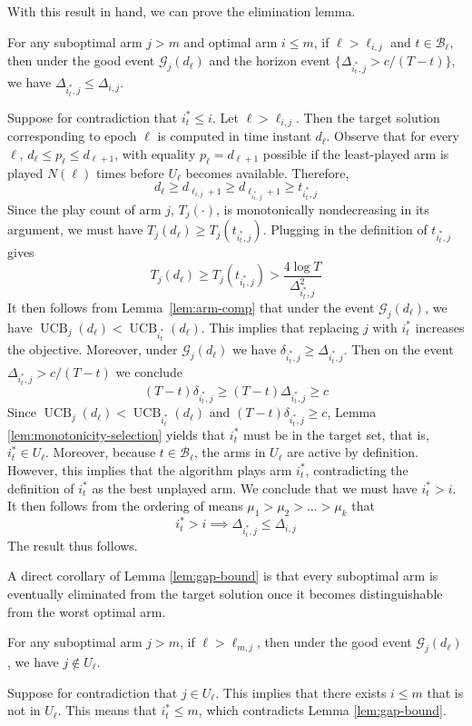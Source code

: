 \documentclass[opre,blindrev]{informs3}
\newcommand{\UCB}{\operatorname{UCB}}
\begin{document}
\begin{APPENDICES}
With this result in hand, we can prove the elimination lemma.
\begin{lemma} \label{lem:gap-bound}
    For any suboptimal arm \(j>m\) and optimal arm \(i\leq m\), if \(\ell> \ell_{i,j}\) and \(t\in \mathcal{B}_{\ell}\), then under the good event \(\mathcal{G}_j(d_\ell)\) and the horizon event \(\{\Delta_{i^*_t, j}> c/(T-t)\}\), we have 
 \(\Delta_{i^*_t,j}\leq \Delta_{i,j}\). 
\end{lemma}
    Suppose for contradiction that \(i^*_t\leq i\). Let \(\ell > \ell_{i,j}\). Then the target solution corresponding to epoch \(\ell\) is computed in time instant \(d_\ell\). Observe that 
    for every \(\ell\), \( d_\ell \leq  p_\ell \leq  d_{\ell+1}\),
    with equality \(p_\ell=d_{\ell +1}\) possible if the least-played arm is played \(N(\ell)\) times before \(U_{\ell}\) becomes available. Therefore,
    \[d_\ell\geq d_{\ell_{i,j}+1} \geq d_{\ell_{i^*_t,j}+1}\geq t_{i^*_t,j}\]
    Since the play count of arm \(j\), \(T_j(\cdot)\), is monotonically nondecreasing in its argument, we must have \(T_j(d_\ell)\geq T_j(t_{i^*_t,j})\). 
    Plugging in the definition of \(t_{i^*_t,j}\) gives
    \[T_j(d_\ell)\geq T_j(t_{i^*_t,j})>\frac{4\log T}{\Delta^2_{i^*_t,j}}\]
    It then follows from Lemma~\ref{lem:arm-comp} that under the event \(\mathcal{G}_j(d_\ell)\), we have \(\UCB_j(d_\ell)<\UCB_{i^*_t}(d_\ell)\).
    This implies that replacing \(j\) with \(i^*_t\) increases the objective. Moreover, under \(\mathcal{G}_j(d_{\ell})\) we have \(\delta_{i^*_t,j}\geq \Delta_{i^*_t,j}\). Then on the event \(\Delta_{i^*_t, j}> c/(T-t)\) we conclude
    \[(T-t)\delta_{i^*_t,j}\geq (T-t)\Delta_{i^*_t,j}\geq c\]
    Since \(\UCB_j(d_\ell)<\UCB_{i^*_t}(d_\ell)\) and \((T-t)\delta_{i^*_t,j}\geq c\), Lemma \ref{lem:monotonicity-selection} yields that \(i^*_t\) must be in the target set, that is, \(i^*_t\in U_{\ell}\). Moreover, because \(t\in \mathcal{B}_\ell\), the arms in \(U_{\ell}\) are active by definition. However, this implies that the algorithm plays arm \(i^*_t\), contradicting the definition of \(i^*_t\) as the best unplayed arm. We conclude that we must have \(i^*_t>i\). It then follows from the ordering of means \(\mu_1 > \mu_2 > \dots > \mu_k\) that
    \[i^*_t>i\implies \Delta_{i^*_t,j}\leq \Delta_{i,j}\]
The result thus follows. 
\Halmos  

A direct corollary of Lemma \ref{lem:gap-bound} is that every suboptimal arm is eventually eliminated from the target solution once it becomes distinguishable from the worst optimal arm.
\begin{corollary} \label{cor:final-phase}
    For any suboptimal arm \(j>m\), if \(\ell> \ell_{m,j}\), then under the good event \(\mathcal{G}_j(d_\ell)\), we have \(j\not\in U_{\ell}\).
\end{corollary}
    Suppose for contradiction that \(j\in U_\ell\). This implies that there exists \(i\leq m\) that is not in \(U_{\ell}\). This means that \(i^*_t\leq m\), which contradicts Lemma \ref{lem:gap-bound}.
\Halmos  


\end{APPENDICES}
\end{document}
